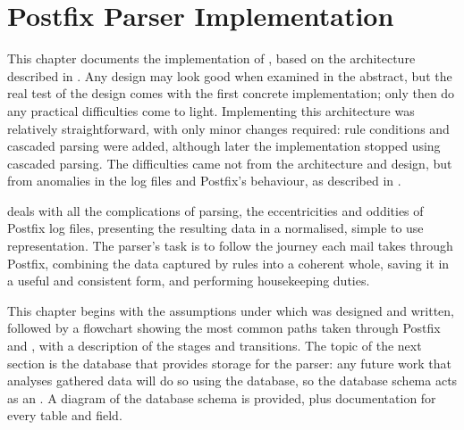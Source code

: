 \chapter{Postfix Parser Implementation}

\label{Postfix Parser Implementation}

This chapter documents the implementation of \parsername{}, based on the
architecture described in .  Any design may
look good when examined in the abstract, but the real test of the design
comes with the first concrete implementation; only then do any practical
difficulties come to light.  Implementing this architecture was relatively
straightforward, with only minor changes required: rule conditions and
cascaded parsing were added, although later the implementation stopped
using cascaded parsing.  The difficulties came not from the architecture
and design, but from anomalies in the log files and Postfix's behaviour, as
described in .

\parsername{} deals with all the complications of parsing, the
eccentricities and oddities of Postfix log files, presenting the resulting
data in a normalised, simple to use representation.  The parser's task is
to follow the journey each mail takes through Postfix, combining the data
captured by rules into a coherent whole, saving it in a useful and
consistent form, and performing housekeeping duties.

This chapter begins with the assumptions under which \parsername{} was
designed and written, followed by a flowchart showing the most common paths
taken through Postfix and \parsername{}, with a description of the stages
and transitions.  The topic of the next section is the database that
provides storage for the parser: any future work that analyses gathered
data will do so using the database, so the database schema acts as an
.  A diagram of the database schema is provided, plus
documentation for every table and field.

